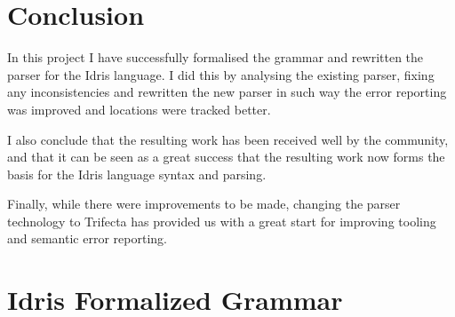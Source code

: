 \documentclass[a4paper]{article}%
\begin{document}
\section{Conclusion}
\label{sec:Conclusion}
In this project I have successfully formalised the grammar and rewritten the parser for the Idris language.
I did this by analysing the existing parser, fixing any inconsistencies and rewritten the new parser in such way the error reporting was improved and locations were tracked better.

I also conclude that the resulting work has been received well by the community, and that it can be seen as a great success that the resulting work now forms the basis for
the Idris language syntax and parsing.

Finally, while there were improvements to be made, changing the parser technology to Trifecta has provided us with a great start for improving tooling and semantic error reporting.





\appendix
\section{Idris Formalized Grammar}
\label{sec:IdrisFormalizedGrammar}
  
\end{document}
